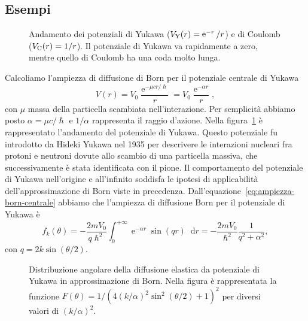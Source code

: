 \documentclass[a4paper,fleqn,twoside,12pt]{article}
\newcommand*{\dd}{\mathop{}\!\mathrm{d}} %
\DeclareMathOperator{\e}{\mathrm{e}} %
\begin{document}
\subsection{Esempi}
\label{sec:esempi-born}

\begin{figure}
  \centering
  
  \caption{Andamento dei potenziali di Yukawa ($V_{\textup{Y}}(r) = \e^{-r}/r$)
    e di Coulomb ($V_{\textup{C}}(r)=1/r$).  Il potenziale di Yukawa va
    rapidamente a zero, mentre quello di Coulomb ha una coda molto lunga.}
  \label{fig:pot-yukawa}
\end{figure}
Calcoliamo l'ampiezza di diffusione di Born per il potenziale centrale di Yukawa
\begin{equation}
  V(r) = V_{0}\frac{\e^{-\mu cr/\hslash}}{r} = V_{0}\frac{\e^{-\alpha r}}{r},
\end{equation}
con $\mu$ massa della particella scambiata nell'interazione.  Per semplicità
abbiamo posto $\alpha = \mu c/\hslash$ e $1/\alpha$ rappresenta il raggio
d'azione.  Nella figura~\ref{fig:pot-yukawa} è rappresentato l'andamento del
potenziale di Yukawa.  Questo potenziale fu introdotto da Hideki Yukawa nel 1935
per descrivere le interazioni nucleari fra protoni e neutroni dovute allo
scambio di una particella massiva, che successivamente è stata identificata con
il pione.
Il comportamento del potenziale di Yukawa nell'origine e all'infinito soddisfa
le ipotesi di applicabilità dell'approssimazione di Born viste in precedenza.
Dall'equazione~\eqref{eq:ampiezza-born-centrale} abbiamo che l'ampiezza di
diffusione Born per il potenziale di Yukawa è
\begin{equation}
  f_{k}(\theta) = -\frac{2mV_{0}}{q\hslash^{2}} \int_{0}^{+\infty} \e^{-\alpha
    r}\sin(qr)\dd r = -\frac{2mV_{0}}{\hslash^{2}} \frac{1}{q^{2} + \alpha^{2}},
\end{equation}
con $q = 2k\sin(\theta/2)$.
\begin{figure}
  \centering
  
  \caption{Distribuzione angolare della diffusione elastica da potenziale di
    Yukawa in approssimazione di Born.  Nella figura è rappresentata la funzione
    $F(\theta) = 1/(4(k/\alpha)^{2}\sin^{2}(\theta/2)+1)^{2}$ per diversi valori
    di $(k/\alpha)^{2}$.}
  \label{fig:sez-urto-yukawa}
\end{figure}
\end{document}
